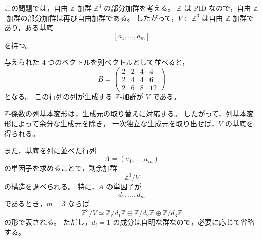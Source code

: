 \begin{background}
	この問題では，自由 \(\mathbb{Z}\)-加群 \(\mathbb{Z}^3\) の部分加群を考える。
	\(\mathbb{Z}\) は PID なので，自由 \(\mathbb{Z}\)-加群の部分加群は再び自由加群である。
	したがって，\(V\subset \mathbb{Z}^3\) は自由 \(\mathbb{Z}\)-加群であり，ある基底
	\[
	[a_1,\ldots,a_m]
	\]
	を持つ。
	
	与えられた \(4\) つのベクトルを列ベクトルとして並べると，
	\[
	B=
	\begin{pmatrix}
		2 & 2 & 4 & 4\\
		2 & 4 & 4 & 6\\
		2 & 6 & 8 & 12
	\end{pmatrix}
	\]
	となる。
	この行列の列が生成する \(\mathbb{Z}\)-加群が \(V\) である。
	
	\(\mathbb{Z}\)-係数の列基本変形は，生成元の取り替えに対応する。
	したがって，列基本変形によって余分な生成元を除き，
	一次独立な生成元を取り出せば，\(V\) の基底を得られる。
	
	また，基底を列に並べた行列
	\[
	A=(a_1,\ldots,a_m)
	\]
	の単因子を求めることで，剰余加群
	\[
	\mathbb{Z}^3/V
	\]
	の構造を調べられる。
	特に，\(A\) の単因子が
	\[
	d_1,\ldots,d_m
	\]
	であるとき，\(m=3\) ならば
	\[
	\mathbb{Z}^3/V
	\simeq
	\mathbb{Z}/d_1\mathbb{Z}
	\oplus
	\mathbb{Z}/d_2\mathbb{Z}
	\oplus
	\mathbb{Z}/d_3\mathbb{Z}
	\]
	の形で表される。
	ただし，\(d_i=1\) の成分は自明な群なので，必要に応じて省略する。
\end{background}

